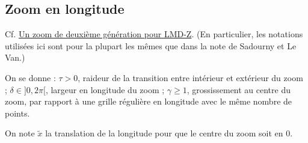 \documentclass[a4paper,english,french]{article}
\begin{document}
\subsection{Zoom en longitude}

Cf. \href{http://lmdz.lmd.jussieu.fr/developpeurs/notes-techniques/ressources/zoom_text.pdf}{Un
  zoom de deuxième génération pour LMD-Z}. (En particulier, les
notations utilisées ici sont pour la plupart les mêmes que dans la
note de Sadourny et Le Van.)

On se donne : $\tau > 0$, raideur de la transition entre intérieur et
extérieur du zoom ; $\delta \in ]0, 2 \pi[$, largeur en longitude du
zoom ; $\gamma \ge 1$, grossissement au centre du zoom, par rapport à
une grille régulière en longitude avec le même nombre de points.

On note $\tilde x$ la translation de la longitude pour que le centre du
zoom soit en 0.
\end{document}
